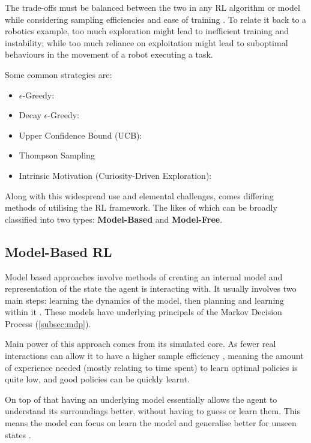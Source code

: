   The trade-offs must be balanced between the two in any RL algorithm or model while considering sampling efficiencies and ease of training \cite{liu2019simpleexplorationsampleefficient}. To relate it back to a robotics example, too much exploration might lead to inefficient training and instability; while too much reliance on exploitation might lead to suboptimal behaviours in the movement of a robot executing a task. 

  Some common strategies are:
  \begin{itemize}
    \item $\epsilon$-Greedy:
    \item Decay $\epsilon$-Greedy:
    \item Upper Confidence Bound (UCB):
    \item Thompson Sampling
    \item Intrinsic Motivation (Curiosity-Driven Exploration):
  \end{itemize}
  
  Along with this widespread use and elemental challenges, comes differing methods of utilising the RL framework. The likes of which can be broadly classified into two types: \textbf{Model-Based} and \textbf{Model-Free}.
  
  \subsection{Model-Based RL}
  Model based approaches involve methods of creating an internal model and representation of the state the agent is interacting with. It usually involves two main steps: learning the dynamics of the model, then planning and learning within it \cite{MAL-086}. These models have underlying principals of the Markov Decision Process (\ref{subsec:mdp}).

  Main power of this approach comes from its simulated core. As fewer real interactions can allow it to have a higher sample efficiency \cite{liu2021DRLminireview,wu23robotLearn}, meaning the amount of experience needed (mostly relating to time spent) to learn optimal policies is quite low, and good policies can be quickly learnt.

  On top of that having an underlying model essentially allows the agent to understand its surroundings better, without having to guess or learn them. This means the model can focus on learn the model and generalise better for unseen states \cite{MAL-086}.
  
